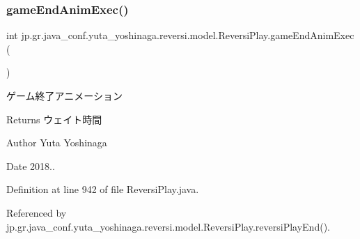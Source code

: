 \subsubsection{\texorpdfstring{game\+End\+Anim\+Exec()}{gameEndAnimExec()}}
{\footnotesize\ttfamily int jp.\+gr.\+java\+\_\+conf.\+yuta\+\_\+yoshinaga.\+reversi.\+model.\+Reversi\+Play.\+game\+End\+Anim\+Exec (\begin{DoxyParamCaption}{ }\end{DoxyParamCaption})}



ゲーム終了アニメーション 

\begin{DoxyReturn}{Returns}
ウェイト時間 
\end{DoxyReturn}
\begin{DoxyAuthor}{Author}
Yuta Yoshinaga 
\end{DoxyAuthor}
\begin{DoxyDate}{Date}
2018.. 
\end{DoxyDate}


Definition at line 942 of file Reversi\+Play.\+java.



Referenced by jp.\+gr.\+java\+\_\+conf.\+yuta\+\_\+yoshinaga.\+reversi.\+model.\+Reversi\+Play.\+reversi\+Play\+End().

